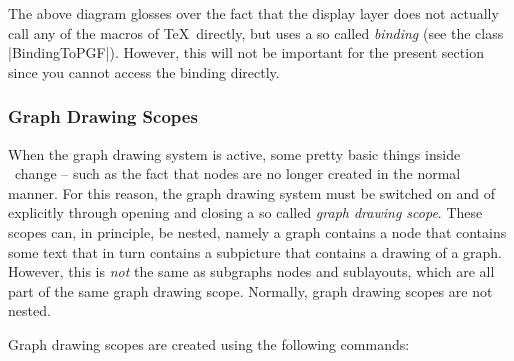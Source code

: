 \medskip

The above diagram glosses over the fact that the display layer does
not actually call any of the macros of \TeX\ directly, but uses a so
called \emph{binding} (see the class |BindingToPGF|). However, this
will not be important for the present section since you cannot access
the binding directly.



\subsubsection{Graph Drawing Scopes}

\label{section-gd-scopes}

When the graph drawing system is active, some pretty basic things
inside \pgfname\ change -- such as the fact that nodes are no longer
created in the normal manner. For this reason, the graph drawing
system must be switched on and of explicitly through opening and
closing a so called \emph{graph drawing scope}. These scopes can, in
principle, be nested, namely a graph contains a node that
contains some text that in turn contains a subpicture that contains a
drawing of a graph. However, this is \emph{not} the same as subgraphs
nodes and sublayouts, which are all part of the same graph drawing
scope. Normally, graph drawing scopes are not nested.

Graph drawing scopes are created using the following commands:

